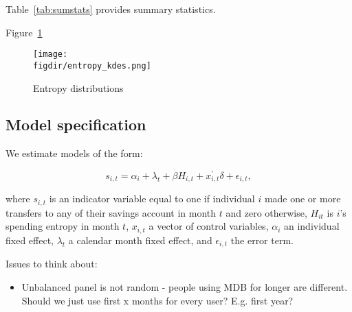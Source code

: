 Table~\ref{tab:sumstats} provides summary statistics.



Figure~\ref{fig:entropy_kdes}
\begin{figure}[H]
    \center \newcommand\width{\textwidth} \caption{Entropy distributions}
    \label{fig:entropy_kdes}
    \texttt{[image: \\figdir/entropy\_kdes.png]}
    \fignote{\width}{}
\end{figure}




\subsection{Model specification}%
\label{par:model_specification}

We estimate models of the form: 

\begin{equation}
    s_{i,t} = \alpha_i + \lambda_t + \beta H_{i,t} + x^\prime_{i,t} \delta +
    \epsilon_{i,t},
\end{equation}

where $s_{i,t}$ is an indicator variable equal to one if individual $i$ made
one or more transfers to any of their savings account in month $t$ and zero
otherwise, $H_{it}$ is $i$'s spending entropy in month $t$, $x_{i,t}$ a vector
of control variables, $\alpha_i$ an individual fixed effect, $\lambda_t$ a
calendar month fixed effect, and $\epsilon_{i, t}$ the error term.

Issues to think about:
\begin{itemize}
    \item Unbalanced panel is not random - people using MDB for longer are
        different. Should we just use first x months for every user? E.g. first
        year?
\end{itemize}

